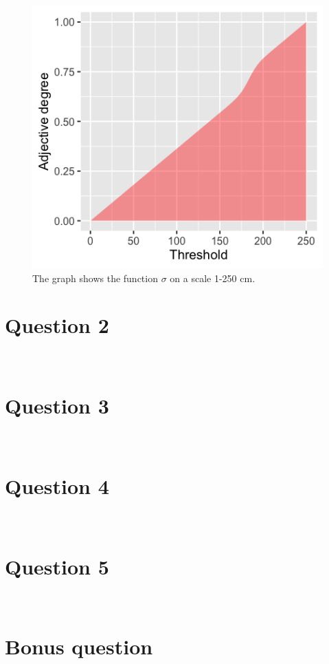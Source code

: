 \documentclass[11pt,a4paper,oneside]{article}
\begin{document}
\begin{figure}[H]
    \centering
    \includegraphics[width=\textwidth]{figs/Question_1_sigma.png}
    \caption{The graph shows the function $\sigma$ on a scale 1-250 cm.}
  \label{fig:q1_sigma}
\end{figure}



\section{Question 2}
\label{Q2}
\textit{}\\

\section{Question 3}
\label{Q3}
\textit{}\\

\section{Question 4}
\label{Q4}
\textit{}\\

\section{Question 5}
\label{Q5}
\textit{}\\

\section{Bonus question}
\label{bonus}
\textit{}\\

\clearpage 
\printbibliography
\end{document}
